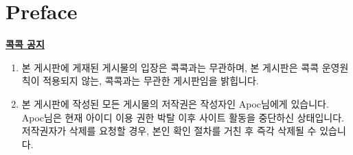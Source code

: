\chapter*{Preface}

\href{https://www.kockoc.com/index.php?mid=Apoc&page=22&document_srl=810609}{\textbf{콕콕 공지}}

\begin{enumerate}
    \item 본 게시판에 게재된 게시물의 입장은 콕콕과는 무관하며,
    본 게시판은 콕콕 운영원칙이 적용되지 않는, 콕콕과는 무관한 게시판임을 밝힙니다.
    
    \item 본 게시판에 작성된 모든 게시물의 저작권은 작성자인 Apoc님에게 있습니다.
    Apoc님은 현재 아이디 이용 권한 박탈 이후 사이트 활동을 중단하신 상태입니다.
    저작권자가 삭제를 요청할 경우, 본인 확인 절차를 거친 후 즉각 삭제될 수 있습니다.
    
\end{enumerate}
